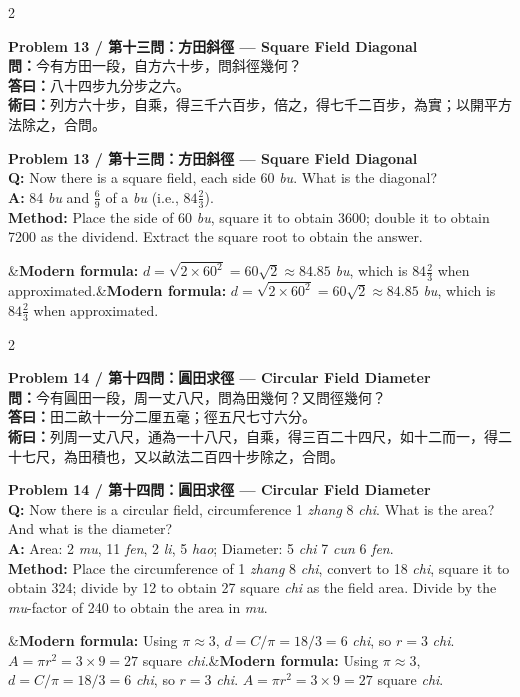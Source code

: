 \documentclass[11pt,a4paper]{article}
\newcommand{\bilingualproblem}[4]{%
  \begin{paracol}{2}
  \begin{leftcolumn}
  \noindent\textbf{\color{problemcolor}#1}\\[0.2cm]
  #2
  \end{leftcolumn}
  \switchcolumn
  \noindent\textbf{\color{problemcolor}#1}\\[0.2cm]
  #3
  \end{paracol}
  \ifx&#4&\else\vspace{0.3cm}\noindent#4\fi
  \vspace{0.5cm}
}
\newcommand{\wen}[1]{\textcolor{problemcolor}{\textbf{問：}}#1}
\newcommand{\da}[1]{\textcolor{answercolor}{\textbf{答曰：}}#1}
\newcommand{\shu}[1]{\textcolor{methodcolor}{\textbf{術曰：}}#1}
\newcommand{\wenen}[1]{\textcolor{problemcolor}{\textbf{Q:}} #1}
\newcommand{\daen}[1]{\textcolor{answercolor}{\textbf{A:}} #1}
\newcommand{\shuen}[1]{\textcolor{methodcolor}{\textbf{Method:}} #1}
\begin{document}
\bilingualproblem{Problem 13 / 第十三問：方田斜徑 --- Square Field Diagonal}{
\wen{今有方田一段，自方六十步，問斜徑幾何？}\\[0.2cm]
\da{八十四步九分步之六。}\\[0.2cm]
\shu{列方六十步，自乘，得三千六百步，倍之，得七千二百步，為實；以開平方法除之，合問。}
}{
\wenen{Now there is a square field, each side 60 \textit{bu}. What is the diagonal?}\\[0.2cm]
\daen{84 \textit{bu} and $\frac{6}{9}$ of a \textit{bu} (i.e., $84\frac{2}{3}$).}\\[0.2cm]
\shuen{Place the side of 60 \textit{bu}, square it to obtain 3600; double it to obtain 7200 as the dividend. Extract the square root to obtain the answer.}
}{\textbf{Modern formula:} $d = \sqrt{2 \times 60^2} = 60\sqrt{2} \approx 84.85$ \textit{bu}, which is $84\frac{2}{3}$ when approximated.}

\bilingualproblem{Problem 14 / 第十四問：圓田求徑 --- Circular Field Diameter}{
\wen{今有圓田一段，周一丈八尺，問為田幾何？又問徑幾何？}\\[0.2cm]
\da{田二畝十一分二厘五毫；徑五尺七寸六分。}\\[0.2cm]
\shu{列周一丈八尺，通為一十八尺，自乘，得三百二十四尺，如十二而一，得二十七尺，為田積也，又以畝法二百四十步除之，合問。}
}{
\wenen{Now there is a circular field, circumference 1 \textit{zhang} 8 \textit{chi}. What is the area? And what is the diameter?}\\[0.2cm]
\daen{Area: 2 \textit{mu}, 11 \textit{fen}, 2 \textit{li}, 5 \textit{hao}; Diameter: 5 \textit{chi} 7 \textit{cun} 6 \textit{fen}.}\\[0.2cm]
\shuen{Place the circumference of 1 \textit{zhang} 8 \textit{chi}, convert to 18 \textit{chi}, square it to obtain 324; divide by 12 to obtain 27 square \textit{chi} as the field area. Divide by the \textit{mu}-factor of 240 to obtain the area in \textit{mu}.}
}{\textbf{Modern formula:} Using $\pi \approx 3$, $d = C/\pi = 18/3 = 6$ \textit{chi}, so $r = 3$ \textit{chi}. $A = \pi r^2 = 3 \times 9 = 27$ square \textit{chi}.}
\end{document}
